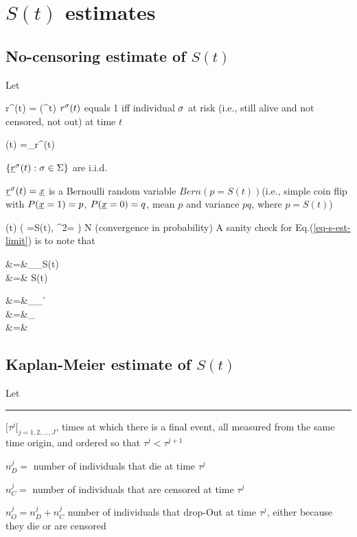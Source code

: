 \section{$S(t)$ estimates}

\subsection{No-censoring estimate of $S(t)$}

Let


\beq
r^\s(t) =  \indi(\tau^\s\geq t)
\eeq
$r^\sigma(t)$ equals 1 iff individual $\sigma$
at risk (i.e., still alive
and not censored, not out) at time $t$

\beq
{}(t) =\sum_\s r^\s(t)
\eeq

$\{\rvr^\s(t):\s\in\Sigma\}$ are i.i.d.

$\rvr^\s(t)=\rvx$ is
a Bernoulli random variable $Bern(p=S(t))$(i.e.,
simple coin flip with $P(\rvx=1)=p$, $P(\rvx=0)=q$,
mean $p$ and variance $pq$, where $p=S(t)$)

\beq
{}(t)\rarrow
\caln\left(
\mu =S(t), \s^2= \right)
N\rarrow \infty
\label{eq-s-est-limit}
\eeq
 (convergence in probability)
A sanity check for Eq.(\ref{eq-s-est-limit}) is to note that

\beqa
{}
&=&\sum_\s {}_{S(t)}
\\
&=&
S(t)
\eeqa


\beqa
{}
&=&\sum_\s \sum_{\s'}
\\
&=&\sum_\s
{}
\\
&=&
\eeqa

\subsection{Kaplan-Meier estimate of $S(t)$}
Let
\hrule
$[\tau^j[_{j=1,2, \ldots, J}$, times at
which there is a final event, all measured
from the same time origin, and
ordered so that $\tau^j < \tau^{j+1}$

$n_D^j=$ number of individuals
that die  at time $\tau^j$


$n_C^j=$ number of individuals
that are censored at time $\tau^j$


$n_O^j=n_D^j+n_C^j$ number of individuals that drop-Out
at time $\tau^j$, either
because they die or are censored


